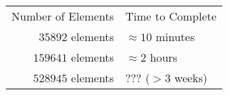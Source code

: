 \begin{tabular}{r | l}
Number of Elements & Time to Complete\\
\(35892\) elements & \(\approx 10\) minutes\\
\(159641\) elements & \(\approx 2\) hours\\
\(528945\) elements & ??? (\(>3\) weeks)\\
\end{tabular}
